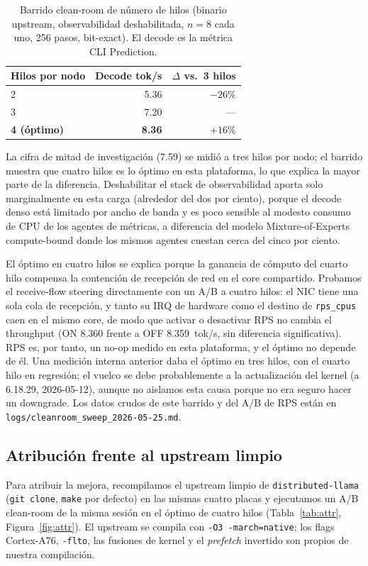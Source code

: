 \documentclass[10pt,a4paper]{article}
\begin{document}
\begin{table}[H]
\centering\small
\caption{Barrido clean-room de número de hilos (binario upstream, observabilidad deshabilitada, $n{=}8$ cada uno, 256 pasos, bit-exact). El decode es la métrica CLI Prediction.}
\label{tab:ntsweep}
\begin{tabular}{@{}lrr@{}}
\toprule
\textbf{Hilos por nodo} & \textbf{Decode tok/s} & \textbf{$\Delta$ vs.\ 3 hilos} \\
\midrule
2 & 5.36 & $-26\%$ \\
3 & 7.20 & --- \\
\textbf{4 (óptimo)} & \textbf{8.36} & $+16\%$ \\
\bottomrule
\end{tabular}
\end{table}

La cifra de mitad de investigación (7.59) se midió a tres hilos por nodo; el barrido muestra que cuatro hilos es lo óptimo en esta plataforma, lo que explica la mayor parte de la diferencia. Deshabilitar el stack de observabilidad aporta solo marginalmente en esta carga (alrededor del dos por ciento), porque el decode denso está limitado por ancho de banda y es poco sensible al modesto consumo de CPU de los agentes de métricas, a diferencia del modelo Mixture-of-Experts compute-bound donde los mismos agentes cuestan cerca del cinco por ciento.

El óptimo en cuatro hilos se explica porque la ganancia de cómputo del cuarto hilo compensa la contención de recepción de red en el core compartido. Probamos el receive-flow steering directamente con un A/B a cuatro hilos: el NIC tiene una sola cola de recepción, y tanto su IRQ de hardware como el destino de \texttt{rps\_cpus} caen en el mismo core, de modo que activar o desactivar RPS no cambia el throughput (ON 8.360 frente a OFF 8.359~tok/s, sin diferencia significativa). RPS es, por tanto, un no-op medido en esta plataforma, y el óptimo no depende de él. Una medición interna anterior daba el óptimo en tres hilos, con el cuarto hilo en regresión; el vuelco se debe probablemente a la actualización del kernel (a 6.18.29, 2026-05-12), aunque no aislamos esta causa porque no era seguro hacer un downgrade. Los datos crudos de este barrido y del A/B de RPS están en \texttt{logs/cleanroom\_sweep\_2026-05-25.md}.

\subsection{Atribución frente al upstream limpio}
\label{sec:attribution}
Para atribuir la mejora, recompilamos el upstream limpio de \texttt{distributed-llama} (\texttt{git clone}, \texttt{make} por defecto) en las mismas cuatro placas y ejecutamos un A/B clean-room de la misma sesión en el óptimo de cuatro hilos (Tabla~\ref{tab:attr}, Figura~\ref{fig:attr}). El upstream se compila con \texttt{-O3 -march=native}; los flags Cortex-A76, \texttt{-flto}, las fusiones de kernel y el \emph{prefetch} invertido son propios de nuestra compilación.
\end{document}
